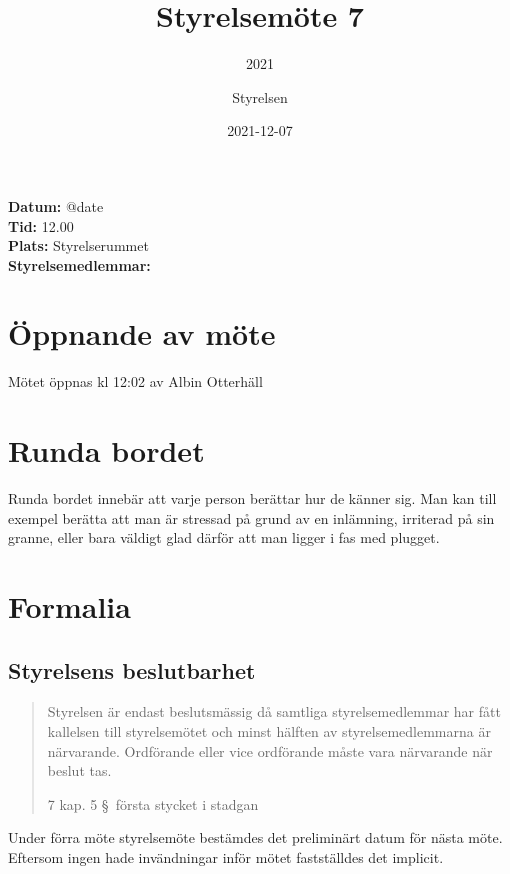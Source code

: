 \documentclass[protokoll]{dvd}
\begin{document}
\title{Styrelsemöte 7}
\subtitle{2021}
\author{Styrelsen}
\date{2021-12-07}

\textbf{Datum:} \csname @date\endcsname\\
\textbf{Tid:} 12.00\\
\textbf{Plats:} Styrelserummet\\
\textbf{Styrelsemedlemmar:}
\begin{närvarande_förtroendevalda}
\end{närvarande_förtroendevalda}


\section{Öppnande av möte}

Mötet öppnas kl 12:02 av Albin Otterhäll

\section{Runda bordet}

    Runda bordet innebär att varje person berättar hur de känner sig.
    Man kan till exempel berätta att man är stressad på grund av en inlämning, irriterad på sin granne, eller bara väldigt glad därför att man ligger i fas med plugget.

\section{Formalia}

    \subsection{Styrelsens beslutbarhet}

        \blockquote[7 kap. 5 \S~första stycket i stadgan][]{
            Styrelsen är endast beslutsmässig då samtliga styrelsemedlemmar har fått kallelsen till styrelsemötet och minst hälften av styrelsemedlemmarna är närvarande.
            Ordförande eller vice ordförande måste vara närvarande när beslut tas.
        }

        Under förra möte styrelsemöte bestämdes det preliminärt datum för nästa möte. Eftersom ingen hade invändningar inför mötet fastställdes det implicit. 
\end{document}
